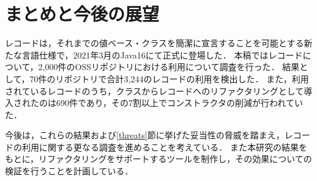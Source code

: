 \section{まとめと今後の展望\label{conclusion}}

レコードは，それまでの値ベース・クラスを簡潔に宣言することを可能とする新たな言語仕様で，2021年3月のJava16にて正式に登場した．
本稿ではレコードについて，2,000件のOSSリポジトリにおける利用について調査を行った．
結果として，70件のリポジトリで合計3,244のレコードの利用を検出した．
また，利用されているレコードのうち，クラスからレコードへのリファクタリングとして導入されたのは690件であり，その7割以上でコンストラクタの削減が行われていた．

今後は，これらの結果および\ref{threats}節に挙げた妥当性の脅威を踏まえ，レコードの利用に関する更なる調査を進めることを考えている．
また本研究の結果をもとに，リファクタリングをサポートするツールを制作し，その効果についての検証を行うことを計画している．
